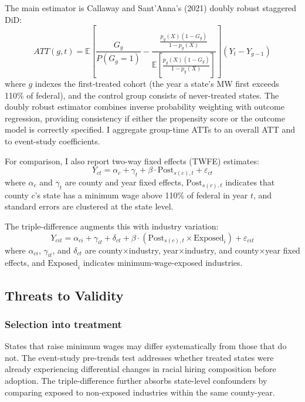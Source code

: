 \documentclass[12pt]{article}
\newcommand{\E}{\mathbb{E}}
\begin{document}
The main estimator is Callaway and Sant'Anna's (2021) doubly robust staggered DiD:
\begin{equation}
ATT(g,t) = \E\left[\frac{G_g}{P(G_g=1)} - \frac{\frac{p_g(X)(1-G_g)}{1-p_g(X)}}{\E\left[\frac{p_g(X)(1-G_g)}{1-p_g(X)}\right]}\right](Y_t - Y_{g-1})
\end{equation}
where $g$ indexes the first-treated cohort (the year a state's MW first exceeds 110\% of federal), and the control group consists of never-treated states. The doubly robust estimator combines inverse probability weighting with outcome regression, providing consistency if either the propensity score or the outcome model is correctly specified. I aggregate group-time ATTs to an overall ATT and to event-study coefficients.

For comparison, I also report two-way fixed effects (TWFE) estimates:
\begin{equation}
Y_{ct} = \alpha_c + \gamma_t + \beta \cdot \text{Post}_{s(c),t} + \varepsilon_{ct}
\end{equation}
where $\alpha_c$ and $\gamma_t$ are county and year fixed effects, $\text{Post}_{s(c),t}$ indicates that county $c$'s state has a minimum wage above 110\% of federal in year $t$, and standard errors are clustered at the state level.

The triple-difference augments this with industry variation:
\begin{equation}
Y_{cit} = \alpha_{ci} + \gamma_{it} + \delta_{ct} + \beta \cdot (\text{Post}_{s(c),t} \times \text{Exposed}_i) + \varepsilon_{cit}
\end{equation}
where $\alpha_{ci}$, $\gamma_{it}$, and $\delta_{ct}$ are county$\times$industry, year$\times$industry, and county$\times$year fixed effects, and $\text{Exposed}_i$ indicates minimum-wage-exposed industries.

\subsection{Threats to Validity}

\subsubsection*{Selection into treatment}  States that raise minimum wages may differ systematically from those that do not. The event-study pre-trends test addresses whether treated states were already experiencing differential changes in racial hiring composition before adoption. The triple-difference further absorbs state-level confounders by comparing exposed to non-exposed industries within the same county-year.
\end{document}
